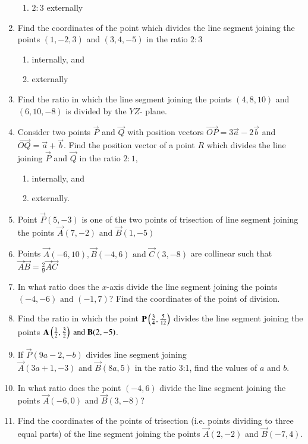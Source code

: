 \begin{enumerate}[label=\thesubsection.\arabic*,ref=\thesubsection.\theenumi]
\begin{enumerate}
\item $2:3$ externally
\end{enumerate}
\item Find the coordinates of the point which divides the line segment joining the points $(1,-2,3)$ and $(3,4,-5)$ in the ratio $2:3$
\begin{enumerate}
\item internally, and
\item externally
\end{enumerate}
\item Find the ratio in which the line segment joining the points $(4,8,10)$ and $(6,10,-8)$ is divided by the $YZ$- plane.
\item Consider two points $\vec{P}$ and $\vec{Q}$ with position vectors $\overrightarrow{OP} = 3\overrightarrow{a}-2\overrightarrow{b}$ and $\overrightarrow{OQ}=\overrightarrow{a}+\overrightarrow{b}$. Find the position vector of a point $R$ which divides the line joining $\vec{P}$ and $\vec{Q}$ in the ratio $2:1$, 
\begin{enumerate}
\item internally, and 
\item externally.
\end{enumerate}
\item Point $\vec{P}(5,-3)$ is one of the two points of trisection of line segment joining the points $\vec{A}(7,-2)\text{ and }\vec{B}(1,-5)$
\item Points $\vec{A}(-6,10),\vec{B}(-4,6) \text{ and } \vec{C}(3,-8)$ are collinear such that $\vec{A}\vec{B}=  \frac{2}{9}\vec{A}\vec{C}$
\item In what ratio does the $x$-axis divide the line segment joining the points $(-4,-6)\text{ and }(-1,7)$? Find the coordinates of the point of division.
\item Find the ratio in which the point $\mathbf{P}\left(\frac{3}{4},\frac{5}{12}\right)$ divides the line segment joining the points $\mathbf{A}\left(\frac{1}{2},\frac{3}{2}\right)\text{ and } \mathbf{B}(2,-5)$.
\item If $\vec{P}(9a-2,-b)$ divides line segment joining $\vec{A}(3a+1,-3)\text{ and }\vec{B}(8a,5)$ in the ratio 3:1, find the values of $a$ and $b$.
\item In what ratio does the point $(-4,6)$ divide the line segment joining the points $\vec{A}(-6,0)$ and $\vec{B}(3,-8)$?
\item Find the coordinates of the points of trisection (i.e. points dividing to three equal parts) of the line segment joining the points $\vec{A}(2,-2)$ and $\vec{B}(-7,4)$.

\end{enumerate}
